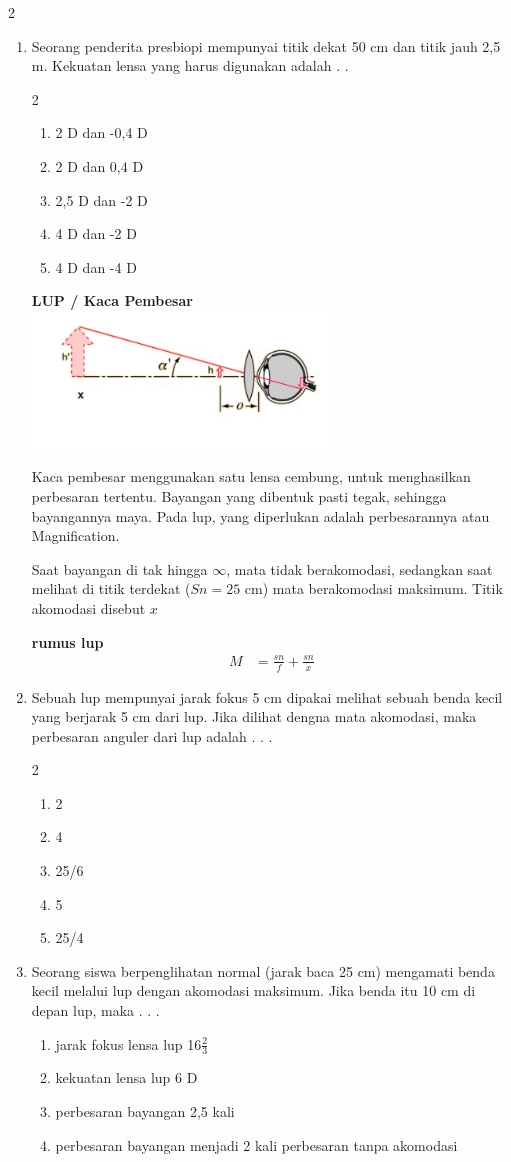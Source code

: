 \documentclass[10pt,a4paper]{extarticle}
\newcommand*\pernyataan[1]{
\begin{enumerate}[label=(\arabic*), itemsep=0pt,topsep=0pt,leftmargin=*] #1 
\end{enumerate}}
\newcommand{\pilgani}[1]{                            \vspace{-0.3cm}\begin{multicols}{2}
 \begin{enumerate}[label=\Alph*., itemsep=0pt,topsep=0pt,leftmargin=*,align=Center]#1                     \end{enumerate}
 \phantom{ini cuma sapi, wedus, dan ayam}
 \end{multicols}}
\begin{document}
\begin{multicols*}{2}
\begin{enumerate}
\item Seorang penderita presbiopi mempunyai titik dekat 50 cm dan titik jauh 2,5 m. Kekuatan lensa yang harus digunakan adalah . . 
\pilgani{
	\item 2 D dan -0,4 D
	\item 2 D dan 0,4 D
	\item 2,5 D dan -2 D
	\item 4 D dan -2 D
	\item 4 D dan -4 D }
\vspace{5cm}


\textbf{LUP /  Kaca Pembesar}\\
\includegraphics[width=8cm]{pic/lup}

Kaca pembesar menggunakan satu lensa cembung, untuk menghasilkan perbesaran tertentu. Bayangan yang dibentuk pasti tegak, sehingga bayangannya maya. Pada lup, yang diperlukan adalah perbesarannya atau Magnification. 

Saat bayangan di tak hingga $\infty$, mata tidak berakomodasi, sedangkan saat melihat di titik terdekat ($Sn = 25$ cm) mata berakomodasi maksimum. Titik akomodasi disebut $x$

\textbf{rumus lup}
\begin{align*}
M &= \frac{sn}{f} + \frac{sn}{x}
\end{align*}

\item Sebuah lup mempunyai jarak fokus 5 cm dipakai melihat sebuah benda kecil yang berjarak 5 cm dari lup. Jika dilihat dengna mata akomodasi, maka perbesaran anguler dari lup adalah . . .
\pilgani{
	\item 2
	\item 4
	\item 25/6
	\item 5
	\item 25/4}
\vspace{2cm}


\item Seorang siswa berpenglihatan normal (jarak baca 25 cm) mengamati benda kecil melalui lup dengan akomodasi maksimum. Jika benda itu 10 cm di depan lup, maka . . .
\pernyataan{
	\item jarak fokus lensa lup 16$\frac{2}{3}$
	\item kekuatan lensa lup 6 D
	\item perbesaran bayangan 2,5 kali
	\item perbesaran bayangan menjadi 2 kali perbesaran tanpa akomodasi
}
\vspace{2cm}


\end{enumerate}
\end{multicols*}
\end{document}
